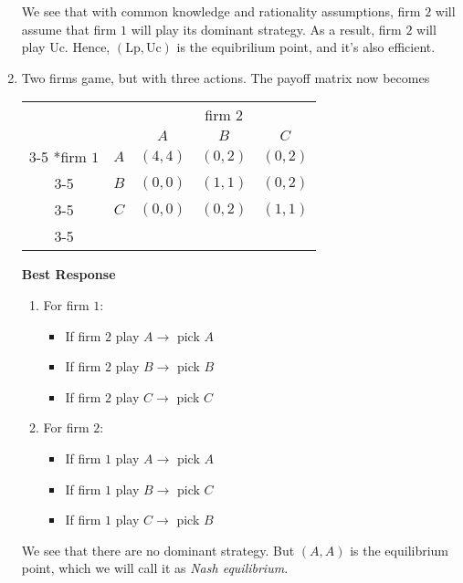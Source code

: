 \begin{eg}
\begin{enumerate}
		      We see that with common knowledge and rationality assumptions, firm \(2\) will assume that firm \(1\) will play its dominant strategy.
		      As a result, firm \(2\) will play \(\mathrm{Uc}\). Hence, \((\mathrm{Lp}, \mathrm{Uc})\) is the equibrilium point, and it's also efficient.
		\item Two firms game, but with three actions. The payoff matrix now becomes
		      \begin{table}[H]
			      \centering
			      \setlength{\extrarowheight}{2pt}
			      \begin{tabular}{cc|c|c|c|}
				                              & \multicolumn{1}{c}{} & \multicolumn{3}{c}{firm $2$}                                                     \\
				                              & \multicolumn{1}{c}{} & \multicolumn{1}{c}{$A$}      & \multicolumn{1}{c}{$B$} & \multicolumn{1}{c}{$C$} \\\cline{3-5}
				      \multirow{3}*{firm $1$} & $A$                  & $(4, 4)$                     & $(0, 2)$                & $(0, 2)$                \\\cline{3-5}
				                              & $B$                  & $(0, 0)$                     & $(1, 1)$                & $(0, 2)$                \\\cline{3-5}
				                              & $C$                  & $(0, 0)$                     & $(0, 2)$                & $(1, 1)$                \\\cline{3-5}
			      \end{tabular}
		      \end{table}

		      \textbf{Best Response}
		      \begin{enumerate}
			      \item For firm \(1\):
			            \begin{itemize}
				            \item If firm \(2\) play \(A\to \) pick \(A\)
				            \item If firm \(2\) play \(B\to \) pick \(B\)
				            \item If firm \(2\) play \(C\to \) pick \(C\)
			            \end{itemize}
			      \item For firm \(2\):
			            \begin{itemize}
				            \item If firm \(1\) play \(A\to \) pick \(A\)
				            \item If firm \(1\) play \(B\to \) pick \(C\)
				            \item If firm \(1\) play \(C\to \) pick \(B\)
			            \end{itemize}
		      \end{enumerate}
		      We see that there are no dominant strategy. But \((A, A)\) is the equilibrium point, which we will call it as \emph{Nash equilibrium}.
	\end{enumerate}
\end{eg}

